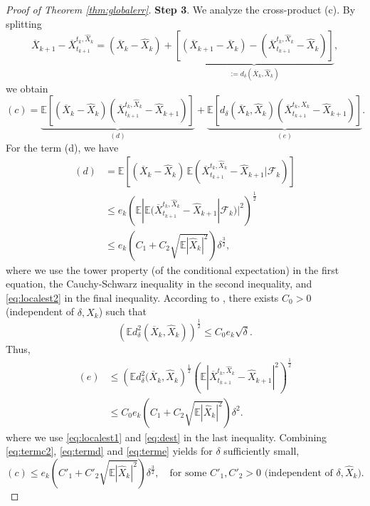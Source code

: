 \documentclass[letterpaper,11pt,reqno]{amsart}
\numberwithin{equation}{section}
\begin{document}
\begin{proof}[Proof of Theorem \ref{thm:globalerr}]
{\bf Step 3}. We analyze the cross-product (c). 
By splitting
\begin{equation*}
\overline{X}_{k+1} - \overline{X}_{t_{k+1}}^{t_k, \widehat{X}_k}
= (\overline{X}_k - \widehat{X}_k) + \underbrace{\left[ (\overline{X}_{k+1} - \overline{X}_k) - (\overline{X}_{t_{k+1}}^{t_k, \widehat{X}_k} - \widehat{X}_k)\right]}_{:= d_\delta(\overline{X}_k, \widehat{X}_k)},
\end{equation*}
we obtain
\begin{equation}
\label{eq:termc2}
(c) = \underbrace{\mathbb{E}\left[(\overline{X}_k - \widehat{X}_k) (\overline{X}_{t_{k+1}}^{t_k, \widehat{X}_{k}}- \widehat{X}_{k+1})\right]}_{(d)} + \underbrace{\mathbb{E}\left[d_\delta(\overline{X}_k, \widehat{X}_k) (\overline{X}_{t_{k+1}}^{t_k, \widehat{X}_{k}}- \widehat{X}_{k+1})\right]}_{(e)}.
\end{equation}
For the term (d), we have
\begin{equation}
\label{eq:termd}
\begin{aligned}
(d)& = \mathbb{E}\left[(\overline{X}_k - \widehat{X}_k) \, \mathbb{E}(\overline{X}_{t_{k+1}}^{t_k, \widehat{X}_{k}}- \widehat{X}_{k+1}| \mathcal{F}_k)\right] \\
& \le e_k \left(\mathbb{E}|\mathbb{E}(\overline{X}_{t_{k+1}}^{t_k, \widehat{X}_{k}}- \widehat{X}_{k+1}| \mathcal{F}_k)|^2 \right)^{\frac{1}{2}} \\
& \le e_k \left(C_1 + C_2 \sqrt{\mathbb{E}|\widehat{X}_k|^2} \right) \delta^{\frac{3}{2}},
\end{aligned}
\end{equation}
where we use the tower property (of the conditional expectation) in the first equation, the Cauchy-Schwarz inequality in the second inequality, and \eqref{eq:localest2} in the final inequality. 
According to \cite[Lemma 1.3]{MT04}, there exists $C_0 > 0$ (independent of $\delta, \widehat{X}_k$) such that
\begin{equation}
\label{eq:dest}
\left(\mathbb{E}d^2_\delta(\overline{X}_k, \widehat{X}_k)\right)^{\frac{1}{2}} \le C_0 e_k \sqrt{\delta}.
\end{equation}
Thus,
\begin{equation}
\label{eq:terme}
\begin{aligned}
(e) & \le \left( \mathbb{E} d^2_\delta(\overline{X}_k, \widehat{X}_k \right)^{\frac{1}{2}} \left( \mathbb{E}|\overline{X}_{t_{k+1}}^{t_k, \widehat{X}_{k}}- \widehat{X}_{k+1}|^2\right)^{\frac{1}{2}} \\
& \le C_0 e_k \left(C_1 + C_2 \sqrt{\mathbb{E}|\widehat{X}_k|^2} \right)\delta^2.
\end{aligned}
\end{equation}
where we use \eqref{eq:localest1} and \eqref{eq:dest} in the last inequality.
Combining \eqref{eq:termc2}, \eqref{eq:termd} and \eqref{eq:terme} yields
for $\delta$ sufficiently small,
\begin{equation}
\label{eq:termc}
(c) \le e_k \left(C'_1 + C'_2 \sqrt{\mathbb{E}|\widehat{X}_k|^2} \right) \delta^{\frac{3}{2}}, \quad \mbox{for some } C'_1, C'_2 > 0 \mbox{ (independent of } \delta, \widehat{X}_k).
\end{equation}


\end{proof}
\end{document}
